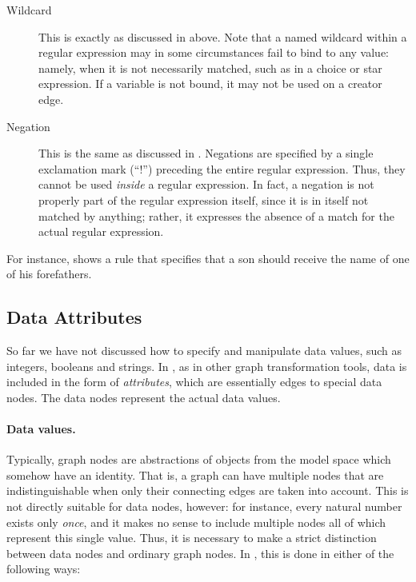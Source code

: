 \begin{description}
\item[Wildcard] This is exactly as discussed in  above.  Note
  that a named wildcard within a regular expression may in some circumstances
  fail to bind to any value: namely, when it is not necessarily matched, such
  as in a choice or star expression. If a variable is not bound, it may not be
  used on a creator edge.

\item[Negation] This is the same as discussed in . Negations
  are specified by a single exclamation mark (``\textsf{!}'') preceding the
  entire regular expression. Thus, they cannot be used \emph{inside} a
  regular expression. In fact, a negation is not properly part of the regular
  expression itself, since it is in itself not matched by anything; rather, it
  expresses the absence of a match for the actual regular expression.
\end{description}

For instance,  shows a rule that specifies that a son should
 receive the name of one of his forefathers.


\subsection{Data Attributes}

So far we have not discussed how to specify and manipulate data values, such as
integers, booleans and strings. In \Groove, as in other graph transformation
tools, data is included in the form of \emph{attributes}, which are essentially
edges to special data nodes. The data nodes represent the actual data values.

\paragraph{Data values.}

Typically, graph nodes are abstractions of objects from the model space which
somehow have an identity. That is, a graph can have multiple nodes that are
indistinguishable when only their connecting edges are taken into account. This
is not directly suitable for data nodes, however: for instance, every natural
number exists only \emph{once}, and it makes no sense to include multiple nodes
all of which represent this single value. Thus, it is necessary to make a
strict distinction between data nodes and ordinary graph nodes. In \Groove,
this is done in either of the following ways:

